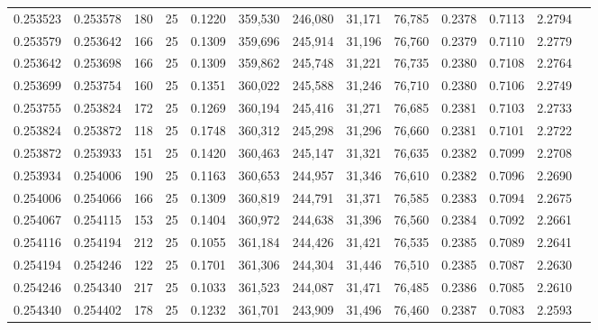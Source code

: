 \begin{tabular}{rrrrrrrrrrrrr}
0.253523 & 0.253578 &   180 &  25 &                                     0.1220 & 359,530 & 246,080 &  31,171 &  76,785 & 0.2378 & 0.7113 & 2.2794 \\
0.253579 & 0.253642 &   166 &  25 &                                     0.1309 & 359,696 & 245,914 &  31,196 &  76,760 & 0.2379 & 0.7110 & 2.2779 \\
0.253642 & 0.253698 &   166 &  25 &                                     0.1309 & 359,862 & 245,748 &  31,221 &  76,735 & 0.2380 & 0.7108 & 2.2764 \\
0.253699 & 0.253754 &   160 &  25 &                                     0.1351 & 360,022 & 245,588 &  31,246 &  76,710 & 0.2380 & 0.7106 & 2.2749 \\
0.253755 & 0.253824 &   172 &  25 &                                     0.1269 & 360,194 & 245,416 &  31,271 &  76,685 & 0.2381 & 0.7103 & 2.2733 \\
0.253824 & 0.253872 &   118 &  25 &                                     0.1748 & 360,312 & 245,298 &  31,296 &  76,660 & 0.2381 & 0.7101 & 2.2722 \\
0.253872 & 0.253933 &   151 &  25 &                                     0.1420 & 360,463 & 245,147 &  31,321 &  76,635 & 0.2382 & 0.7099 & 2.2708 \\
0.253934 & 0.254006 &   190 &  25 &                                     0.1163 & 360,653 & 244,957 &  31,346 &  76,610 & 0.2382 & 0.7096 & 2.2690 \\
0.254006 & 0.254066 &   166 &  25 &                                     0.1309 & 360,819 & 244,791 &  31,371 &  76,585 & 0.2383 & 0.7094 & 2.2675 \\
0.254067 & 0.254115 &   153 &  25 &                                     0.1404 & 360,972 & 244,638 &  31,396 &  76,560 & 0.2384 & 0.7092 & 2.2661 \\
0.254116 & 0.254194 &   212 &  25 &                                     0.1055 & 361,184 & 244,426 &  31,421 &  76,535 & 0.2385 & 0.7089 & 2.2641 \\
0.254194 & 0.254246 &   122 &  25 &                                     0.1701 & 361,306 & 244,304 &  31,446 &  76,510 & 0.2385 & 0.7087 & 2.2630 \\
0.254246 & 0.254340 &   217 &  25 &                                     0.1033 & 361,523 & 244,087 &  31,471 &  76,485 & 0.2386 & 0.7085 & 2.2610 \\
0.254340 & 0.254402 &   178 &  25 &                                     0.1232 & 361,701 & 243,909 &  31,496 &  76,460 & 0.2387 & 0.7083 & 2.2593 \\

\end{tabular}
